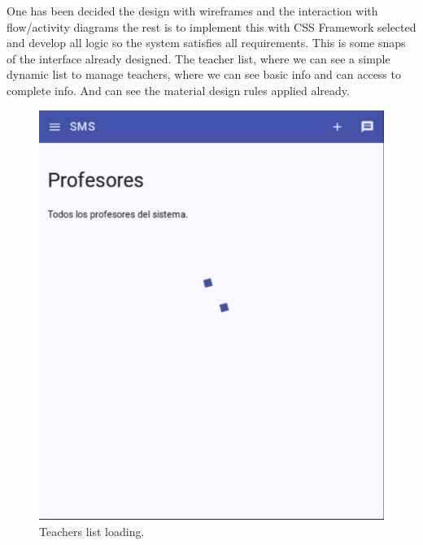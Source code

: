 \noindent One has been decided the design with wireframes and the interaction
with flow/activity diagrams the rest is to implement this with CSS Framework
selected and develop all logic so the system satisfies all requirements.
This is some snaps of the interface already designed.
\intro
The teacher list, where we can see a simple dynamic list to manage teachers,
where we can see basic info and can access to complete info. And can see the
material design rules applied already.

\begin{figure}[H]
\centering
\begin{minipage}{.5\textwidth}
  \centering
  \includegraphics[scale=0.3]{img/snaps/teachers_list_preload.png}
  \caption{Teachers list loading.}
\end{minipage}%
\begin{minipage}{.5\textwidth}
  \centering

\end{minipage}
\end{figure}
